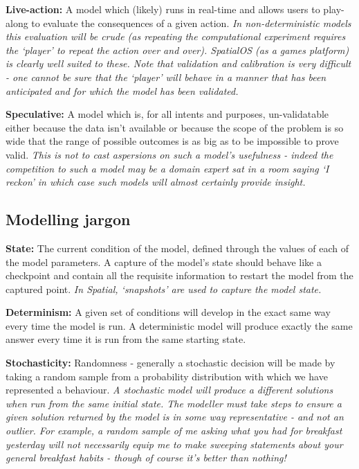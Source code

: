 \noindent \textbf{Live-action:} A model which (likely) runs in real-time and allows users to
play-along to evaluate the consequences of a given action. \textit{In non-deterministic
models this evaluation will be crude (as repeating the computational experiment
requires the ‘player’ to repeat the action over and over).  SpatialOS (as a
games platform) is clearly well suited to these. Note that validation and
calibration is very difficult - one cannot be sure that the ‘player’ will
behave in a manner that has been anticipated and for which the model has been
validated.}

\noindent \textbf{Speculative:} A model which is, for all intents and purposes, un-validatable
either because the data isn’t available or because the scope of the problem is
so wide that the range of possible outcomes is as big as to be impossible to
prove valid. \textit{This is not to cast aspersions on such a model’s
usefulness - indeed the competition to such a model may be a domain expert sat
in a room saying ‘I reckon’ in which case such models will almost certainly
provide insight.}

\subsection{Modelling jargon} 

\noindent \textbf{State:} The current condition of the model, defined through the
values of each of the model parameters. A capture of the model’s state should
behave like a checkpoint and contain all the requisite information to restart
the model from the captured point.  \textit{In Spatial, ‘snapshots’ are used to capture
the model state.}

\noindent \textbf{Determinism:} A given set of conditions will develop in the exact same way every
time the model is run.  A deterministic model will produce exactly the same
answer every time it is run from the same starting state.

\noindent \textbf{Stochasticity:} Randomness - generally a stochastic decision will be made by
taking a random sample from a probability distribution with which we have
represented a behaviour.  \textit{A stochastic model will produce a different solutions
when run from the same initial state. The modeller must take steps to ensure a
given solution returned by the model is in some way representative  - and not
an outlier. For example, a random sample of me asking what you had for
breakfast yesterday will not necessarily equip me to make sweeping statements
about your general breakfast habits - though of course it’s better than
nothing!}

